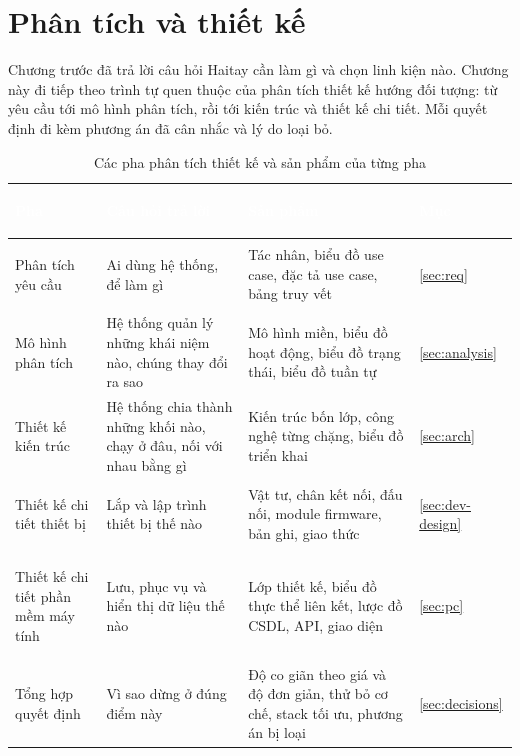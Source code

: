 \chapter{Phân tích và thiết kế}

Chương trước đã trả lời câu hỏi Haitay cần làm gì và chọn linh kiện nào. Chương này đi tiếp theo trình tự quen thuộc của phân tích thiết kế hướng đối tượng: từ yêu cầu tới mô hình phân tích, rồi tới kiến trúc và thiết kế chi tiết. Mỗi quyết định đi kèm phương án đã cân nhắc và lý do loại bỏ.

\begin{table}[H]
    \centering
    \small
    \renewcommand{\arraystretch}{1.35}
    \caption{Các pha phân tích thiết kế và sản phẩm của từng pha}
    \label{tab:phases}
    \begin{tabular}{>{\bfseries\raggedright\arraybackslash}m{3.0cm} >{\raggedright\arraybackslash}m{4.6cm} >{\raggedright\arraybackslash}m{5.0cm} >{\centering\arraybackslash}m{1.4cm}}
        \toprule
        \rowcolor{haitayblue}
        \textcolor{white}{Pha} & \textcolor{white}{Câu hỏi trả lời} & \textcolor{white}{Sản phẩm} & \textcolor{white}{Mục} \\
        \midrule
        \rowcolor{haitayblue!8}
        Phân tích yêu cầu & Ai dùng hệ thống, để làm gì & Tác nhân, biểu đồ use case, đặc tả use case, bảng truy vết & \ref{sec:req} \\
        Mô hình phân tích & Hệ thống quản lý những khái niệm nào, chúng thay đổi ra sao & Mô hình miền, biểu đồ hoạt động, biểu đồ trạng thái, biểu đồ tuần tự & \ref{sec:analysis} \\
        \rowcolor{haitayblue!8}
        Thiết kế kiến trúc & Hệ thống chia thành những khối nào, chạy ở đâu, nối với nhau bằng gì & Kiến trúc bốn lớp, công nghệ từng chặng, biểu đồ triển khai & \ref{sec:arch} \\
        Thiết kế chi tiết thiết bị & Lắp và lập trình thiết bị thế nào & Vật tư, chân kết nối, đấu nối, module firmware, bản ghi, giao thức & \ref{sec:dev-design} \\
        \rowcolor{haitayblue!8}
        Thiết kế chi tiết phần mềm máy tính & Lưu, phục vụ và hiển thị dữ liệu thế nào & Lớp thiết kế, biểu đồ thực thể liên kết, lược đồ CSDL, API, giao diện & \ref{sec:pc} \\
        Tổng hợp quyết định & Vì sao dừng ở đúng điểm này & Độ co giãn theo giá và độ đơn giản, thử bỏ cơ chế, stack tối ưu, phương án bị loại & \ref{sec:decisions} \\
        \bottomrule
    \end{tabular}
\end{table}

